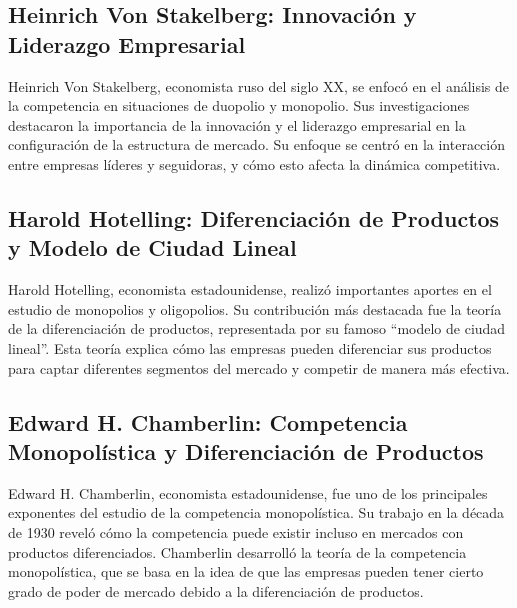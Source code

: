 \documentclass[
  letterpaper,
  DIV=11,
  numbers=noendperiod]{scrartcl}
\begin{document}
\hypertarget{heinrich-von-stakelberg-innovaciuxf3n-y-liderazgo-empresarial}{%
\subsection{Heinrich Von Stakelberg: Innovación y Liderazgo
Empresarial}\label{heinrich-von-stakelberg-innovaciuxf3n-y-liderazgo-empresarial}}

Heinrich Von Stakelberg, economista ruso del siglo XX, se enfocó en el
análisis de la competencia en situaciones de duopolio y monopolio. Sus
investigaciones destacaron la importancia de la innovación y el
liderazgo empresarial en la configuración de la estructura de mercado.
Su enfoque se centró en la interacción entre empresas líderes y
seguidoras, y cómo esto afecta la dinámica competitiva.

\hypertarget{harold-hotelling-diferenciaciuxf3n-de-productos-y-modelo-de-ciudad-lineal}{%
\subsection{Harold Hotelling: Diferenciación de Productos y Modelo de
Ciudad
Lineal}\label{harold-hotelling-diferenciaciuxf3n-de-productos-y-modelo-de-ciudad-lineal}}

Harold Hotelling, economista estadounidense, realizó importantes aportes
en el estudio de monopolios y oligopolios. Su contribución más destacada
fue la teoría de la diferenciación de productos, representada por su
famoso ``modelo de ciudad lineal''. Esta teoría explica cómo las
empresas pueden diferenciar sus productos para captar diferentes
segmentos del mercado y competir de manera más efectiva.

\hypertarget{edward-h.-chamberlin-competencia-monopoluxedstica-y-diferenciaciuxf3n-de-productos}{%
\subsection{Edward H. Chamberlin: Competencia Monopolística y
Diferenciación de
Productos}\label{edward-h.-chamberlin-competencia-monopoluxedstica-y-diferenciaciuxf3n-de-productos}}

Edward H. Chamberlin, economista estadounidense, fue uno de los
principales exponentes del estudio de la competencia monopolística. Su
trabajo en la década de 1930 reveló cómo la competencia puede existir
incluso en mercados con productos diferenciados. Chamberlin desarrolló
la teoría de la competencia monopolística, que se basa en la idea de que
las empresas pueden tener cierto grado de poder de mercado debido a la
diferenciación de productos.
\end{document}
